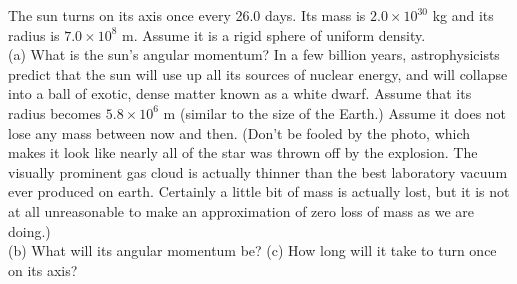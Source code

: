 The sun turns on its axis once every 26.0 days. Its mass
is $2.0\times10^{30}$ kg and its radius is $7.0\times10^8$ m.
Assume it is a rigid sphere of uniform density.\\
(a) What is the sun's angular momentum? \answercheck\hwendpart
In a few billion years, astrophysicists predict that the sun
will use up all its sources of nuclear energy, and will
collapse into a ball of exotic, dense matter known as a
white dwarf. Assume that its radius becomes $5.8\times10^6$ m
(similar to the size of the Earth.) Assume it does not lose
any mass between now and then. (Don't be fooled by the
photo, which makes it look like nearly all of the star was
thrown off by the explosion. The visually prominent gas
cloud is actually thinner than the best laboratory vacuum
ever produced on earth. Certainly a little bit of mass is
actually lost, but it is not at all unreasonable to make an
approximation of zero loss of mass as we are doing.)\\
(b) What will its angular momentum be?\hwendpart
(c) How long will it take to turn once on its axis? \answercheck\hwendpart

